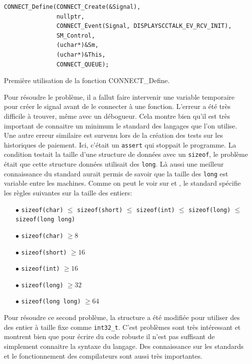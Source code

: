 \documentclass[a4paper]{article}
\begin{document}
\begin{listing}[ht!]
\begin{verbatim}
CONNECT_Define(CONNECT_Create(&Signal),
               nullptr,
               CONNECT_Event(Signal, DISPLAYSCCTALK_EV_RCV_INIT),
               SM_Control,
               (uchar*)&Sm,
               (uchar*)&This,
               CONNECT_QUEUE);
\end{verbatim}
\caption{Première utilisation de la fonction CONNECT\_Define.}
\label{firstconnectdefine}
\end{listing}

Pour résoudre le problème, il a fallut faire intervenir une variable temporaire
pour créer le signal avant de le connecter à une fonction. L'erreur a été très
difficile à trouver, même avec un débogueur. Cela montre bien qu'il est très
important de connaitre un minimum le standard des langages que l'on utilise. Une
autre erreur similaire est survenu lors de la création des tests sur les
historiques de paiement. Ici, c'était un \verb|assert| qui stoppait le
programme. La condition testait la taille d'une structure de données avec un
\verb|sizeof|, le problème était que cette structure données utilisait des
\verb|long|. Là aussi une meilleur connaissance du standard aurait permis de
savoir que la taille des \verb|long| est variable entre les machines. Comme on
peut le voir sur \cite{ISO:C99} et \cite{typescppref}, le standard spécifie les
règles suivantes sur la taille des entiers:

\begin{itemize}
  \item[$\bullet$] \verb|sizeof(char)| $\leq$ \verb|sizeof(short)| $\leq$ \verb|sizeof(int)| $\leq$ \verb|sizeof(long)| $\leq$ \verb|sizeof(long long)|
  \item[$\bullet$] \verb|sizeof(char)| $\geq 8$
  \item[$\bullet$] \verb|sizeof(short)| $\geq 16$
  \item[$\bullet$] \verb|sizeof(int)| $\geq 16$
  \item[$\bullet$] \verb|sizeof(long)| $\geq 32$
  \item[$\bullet$] \verb|sizeof(long long)| $\geq 64$
\end{itemize}

Pour résoudre ce second problème, la structure a été modifiée pour utiliser des
des entier à taille fixe comme \verb|int32_t|. C'est problèmes sont très
intéressant et montrent bien que pour écrire du code robuste il n'est pas
suffisant de simplement connaitre la syntaxe du langage. Des connaissance sur
les standards et le fonctionnement des compilateurs sont aussi très
importantes.\\
\end{document}
